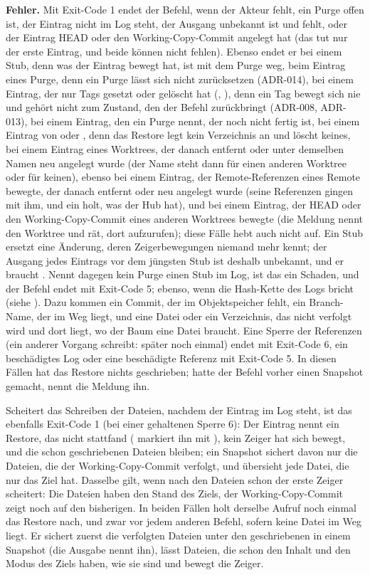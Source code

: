 {\bf Fehler.} Mit Exit-Code 1 endet der Befehl, wenn der Akteur fehlt, ein Purge offen ist, der
Eintrag nicht im Log steht, der Ausgang unbekannt ist und  fehlt, oder der Eintrag
HEAD oder den Working-Copy-Commit angelegt hat (das tut nur der erste Eintrag, und beide können
nicht fehlen). Ebenso endet er bei einem Stub, denn was der Eintrag bewegt hat, ist mit dem Purge
weg, beim Eintrag eines Purge, denn ein Purge lässt sich nicht zurücksetzen (ADR-014), bei
einem Eintrag, der nur Tags gesetzt oder gelöscht hat (, ), denn ein Tag
bewegt sich nie und gehört nicht zum Zustand, den der Befehl zurückbringt (ADR-008, ADR-013),
bei einem Eintrag, den ein Purge nennt, der noch nicht fertig ist, bei einem Eintrag von
 oder , denn das Restore legt kein Verzeichnis an und
löscht keines, bei einem Eintrag eines Worktrees, der danach entfernt oder unter demselben Namen
neu angelegt wurde (der Name steht dann für einen anderen Worktree oder für keinen), ebenso bei
einem Eintrag, der Remote-Referenzen eines Remote bewegte, der danach entfernt oder neu angelegt
wurde (seine Referenzen gingen mit ihm, und ein  holt, was der Hub hat), und bei
einem Eintrag, der HEAD oder den Working-Copy-Commit eines anderen Worktrees bewegte (die
Meldung nennt den Worktree und rät,  dort aufzurufen);
diese Fälle hebt auch  nicht auf. Ein Stub ersetzt eine Änderung, deren
Zeigerbewegungen niemand mehr kennt; der Ausgang jedes Eintrags vor dem jüngsten Stub ist deshalb
unbekannt, und er braucht . Nennt dagegen kein Purge einen Stub im Log, ist das ein
Schaden, und der Befehl endet mit Exit-Code 5; ebenso, wenn die Hash-Kette des Logs bricht
(siehe ).
Dazu kommen ein Commit, der im Objektspeicher fehlt, ein Branch-Name, der im Weg liegt,
und eine Datei oder ein Verzeichnis, das nicht verfolgt wird und dort liegt,
wo der Baum eine Datei braucht.
Eine Sperre der Referenzen (ein anderer Vorgang schreibt: später noch einmal)
endet mit Exit-Code 6, ein beschädigtes Log oder eine beschädigte Referenz mit Exit-Code 5.
In diesen Fällen hat das Restore nichts geschrieben; hatte der Befehl vorher einen Snapshot
gemacht, nennt die Meldung ihn.

Scheitert das Schreiben der Dateien, nachdem der Eintrag im Log steht, ist das ebenfalls
Exit-Code 1 (bei einer gehaltenen Sperre 6):
Der Eintrag nennt ein Restore, das nicht stattfand ( markiert ihn
mit \type{!}), kein Zeiger hat sich bewegt, und die schon geschriebenen Dateien bleiben;
ein Snapshot sichert davon nur die Dateien, die der Working-Copy-Commit verfolgt,
und übersieht jede Datei, die nur das Ziel hat.
Dasselbe gilt, wenn nach den Dateien schon der erste Zeiger scheitert: Die Dateien haben
den Stand des Ziels, der Working-Copy-Commit zeigt noch auf den bisherigen.
In beiden Fällen holt derselbe Aufruf noch einmal das Restore nach,
und zwar vor jedem anderen Befehl,
sofern keine Datei im Weg liegt.
Er sichert zuerst die verfolgten Dateien unter den geschriebenen in einem Snapshot
(die Ausgabe nennt ihn),
lässt Dateien, die schon den Inhalt und den Modus des Ziels haben, wie sie sind
und bewegt die Zeiger.

